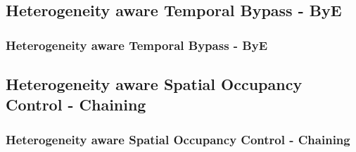 \documentclass{beamer}
\begin{document}

\subsection{Heterogeneity aware Temporal Bypass - ByE}
\begin{frame}
\frametitle{Heterogeneity aware Temporal Bypass - ByE}

\end{frame}

\subsection{Heterogeneity aware Spatial Occupancy Control - Chaining}
\begin{frame}
\frametitle{Heterogeneity aware Spatial Occupancy Control - Chaining}
	
\end{frame}

\end{document}

